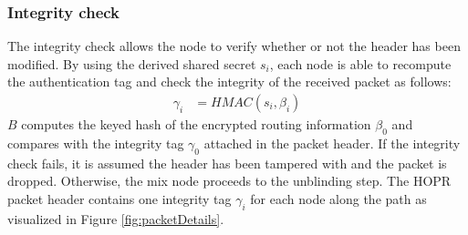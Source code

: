 \subsubsection{Integrity check}
The integrity check allows the node to verify whether or not the header has been modified. By using the derived shared secret $s_i$, each node is able to recompute the authentication tag and check the integrity of the received packet as follows:
\begin{align}
    \gamma_i & =HMAC(s_i,\beta_i)
    \label{eq:6}
\end{align}
$B$ computes the keyed hash of the encrypted routing information $\beta_0$ and compares with the integrity tag $\gamma_0$ attached in the packet header. If the integrity check fails, it is assumed the header has been tampered with and the packet is dropped. Otherwise, the mix node proceeds to the unblinding step. The HOPR packet header contains one integrity tag $\gamma_i$ for each node along the path as visualized in Figure \ref{fig:packetDetails}.
